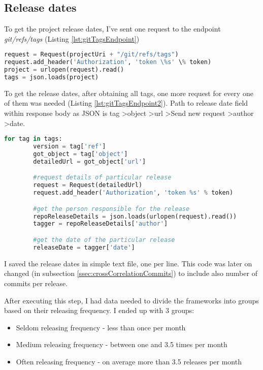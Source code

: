 \subsection{Release dates} \label{ssec:gitReleaseDatesMining}
To get the project release dates, I've sent one request to the endpoint \textit{git/refs/tags} (Listing \ref{lst:gitTagsEndpoint})

\begin{lstlisting}[caption={Requesting all project tags git API tags endpoint},label={lst:gitTagsEndpoint},language=Python]
request = Request(projectUri + "/git/refs/tags")
request.add_header('Authorization', 'token \%s' \% token)
project = urlopen(request).read()
tags = json.loads(project)
\end{lstlisting}

To get the release dates, after obtaining all tags, one more request for every one of them was needed (Listing \ref{lst:gitTagsEndpoint2}). Path to release date field within response body as JSON is tag \textgreater  object \textgreater  url \textgreater  Send new request \textgreater  author \textgreater  date.

\begin{lstlisting}[caption={Requesting tag details and accessing release date},label={lst:gitTagsEndpoint2},language=Python]
	for tag in tags:
		version = tag['ref']
		got_object = tag['object']
		detailedUrl = got_object['url']

		#request details of particular release
		request = Request(detailedUrl)
		request.add_header('Authorization', 'token %s' % token)

		#get the person responsible for the release
		repoReleaseDetails = json.loads(urlopen(request).read())
		tagger = repoReleaseDetails['author']

		#get the date of the particular release
		releaseDate = tagger['date']
\end{lstlisting}

I saved the release dates in simple text file, one per line. This code was later on changed (in subsection \ref{ssec:crossCorrelationCommits}) to include also number of commits per release.

After executing this step, I had data needed to divide the frameworks into groups based on their releasing frequency. I ended up with 3 groups:
\begin{itemize}
\item{Seldom releasing frequency} - less than once per month
\item{Medium releasing frequency} - between one and 3.5 times per month
\item{Often releasing frequency} - on average more than 3.5 releases per month
\end{itemize}

